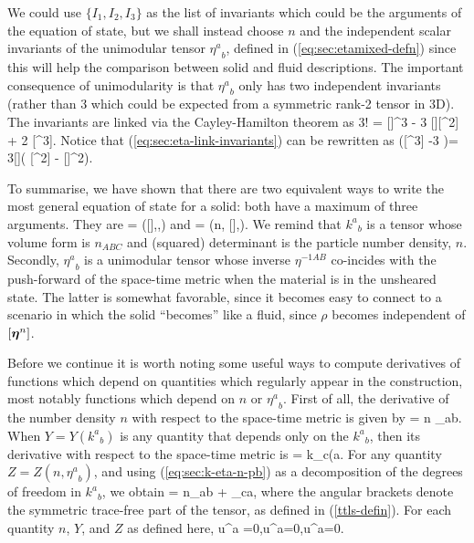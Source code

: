 We  could use $\{I_1,I_2,I_3\}$ as the list of invariants which could be the arguments of the equation of state, but we shall instead choose $n$ and  the independent scalar invariants of the unimodular tensor ${\eta^a}_b$, defined in (\ref{eq:sec:etamixed-defn}) since this will help the comparison between solid and fluid descriptions. The important consequence of   unimodularity is that     ${\eta^a}_b$   only has two independent invariants (rather than 3 which could be expected from a symmetric rank-2 tensor in 3D).  The invariants are linked via the Cayley-Hamilton theorem as
\bea
\label{eq:sec:eta-link-invariants}
3! = [\gbm{\eta}]^3 - 3 [\gbm{\eta}][\gbm{\eta}^2] + 2 [\gbm{\eta}^3].
\eea
Notice that (\ref{eq:sec:eta-link-invariants}) can be rewritten as
\left([\gbm{\eta}^3] -3   \right)= 3[\gbm{\eta}]\left( [\gbm{\eta}^2] - [\gbm{\eta}]^2\right).
\eea

To summarise, we have  shown that there are two  equivalent   ways to write the most general equation of state for a solid: both have a maximum of three arguments. They are
\bse
\bea
\rho = \rho\left([],,\right)
\eea 
and
\bea
\rho = \rho\left(n, [\gbm{\eta}],\left[\gbm{\eta}^2\right]\right).
\eea
\ese
We remind that ${k^a}_b$ is a tensor whose volume form is $n_{ABC}$ and (squared) determinant is the particle number density, $n$. Secondly, ${\eta^a}_b$ is a unimodular tensor whose inverse $\eta^{-1AB}$ co-incides with the push-forward of the space-time metric when the material is in the unsheared state. The latter is somewhat favorable, since it becomes easy to connect to a scenario in which the solid ``becomes'' like a fluid, since $\rho$ becomes independent of $[\bm{\eta}^n]$.
 
 
Before we continue it is worth noting some useful ways to compute derivatives of functions which depend on quantities which regularly appear in the construction, most notably functions which depend on $n$ or ${\eta^a}_b$.
First of all, the derivative of the number density $n$ with respect to the space-time metric is given by
\bea
\label{eq:sec:dndg}
 = \half n \gamma_{ab}.
\eea
When $Y = Y({k^a}_b)$ is any quantity that depends only on the ${k^a}_b$,  then its derivative with respect to the space-time metric is
\bea
\label{eq:pd-Y-g-k}
 = k_{c(a}.
\eea
For any quantity $Z = Z(n,{\eta^a}_b)$, and using (\ref{eq:sec:k-eta-n-pb}) as a decomposition of the degrees of freedom in ${k^a}_b$, we obtain
\bea
\label{eq:sec:Zneta}
 = \half n\gamma_{ab} + \eta_{c\langle a},
\eea
where the angular brackets denote the symmetric trace-free part of the tensor, as defined in (\ref{ttls-defin}). For each quantity $n$, $Y$, and $Z$ as defined here,
\bea
u^a =0,\qquad u^a=0,\qquad u^a=0.
\eea
 



